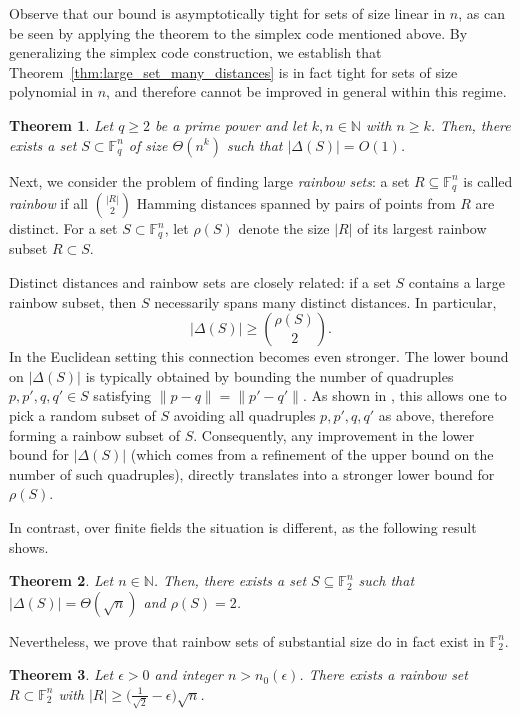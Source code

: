 \documentclass{article}
\newtheorem{thm}{Theorem}%
\theoremstyle{definition}
\begin{document}
Observe that our bound is asymptotically tight for sets of size linear in $n$, as can be seen by 
applying the theorem to the simplex code mentioned above. 
By generalizing the simplex code construction, we establish that Theorem~\ref{thm:large_set_many_distances} is in fact tight for sets of size polynomial in $n$, and therefore cannot be improved in general within this regime.


\begin{thm}\label{thm:exist_few_distances}
    Let $q\ge 2$ be a prime power and let $k, n\in \mathbb{N}$ with $n\geq  k$.
    Then, there exists a set $S\subset \mathbb{F}_q^n$ of size $\Theta(n^k)$ such that $|\Delta(S)|=O(1)$.
\end{thm}

Next, we consider the problem of finding large {\it rainbow sets}:
a set $R\subseteq \mathbb{F}_q^n$ is called {\it rainbow} if all $\binom{|R|}{2}$ Hamming distances spanned by pairs of points from $R$ are distinct.
For a set $S\subset \mathbb{F}_q^n$, let $\rho(S)$ denote the size $|R|$ of its largest rainbow subset $R\subset S$.


Distinct distances and rainbow sets are closely related: if a set 
$S$ contains a large rainbow subset, then 
$S$
necessarily spans many distinct distances. In particular,
$$
|\Delta(S)|\ge \binom{\rho(S)}{2}.
$$
In the Euclidean setting this connection becomes even stronger.
The lower bound on $|\Delta(S)|$ is typically obtained by bounding the number of quadruples $p,p',q,q'\in S$ satisfying $\|p-q\|=\|p'-q'\|$. As shown in \cite{charalambides2013note}, 
this allows one to pick a random subset of $S$ avoiding all quadruples $p,p',q,q'$ as above, therefore forming a rainbow subset of $S$. 
Consequently, any improvement in the lower bound for $|\Delta(S)|$ (which comes from a refinement of the upper bound on the number of such quadruples),
directly translates into a stronger lower bound for $\rho(S)$.

In contrast, over finite fields the situation is different, as the following result shows.
\begin{thm}\label{thm:gap}
    Let $n \in \mathbb{N}$. Then, there exists a set $S \subseteq \mathbb{F}_2^n$ such that $|\Delta(S)| = \Theta(\sqrt{n})$ and $\rho(S) = 2$. 
\end{thm}


Nevertheless, we prove that rainbow sets of substantial size do in fact exist in $\mathbb{F}_2^n$.
\begin{thm}\label{thm:existence_huge_rainbow}
Let $\epsilon > 0$ and integer $n > n_0(\epsilon)$.
    There exists a rainbow set $R\subset \mathbb{F}_2^n$ with $|R| \ge \big(\frac{1}{\sqrt{2}} - \epsilon\big)\sqrt{n}$.
\end{thm}
\end{document}
